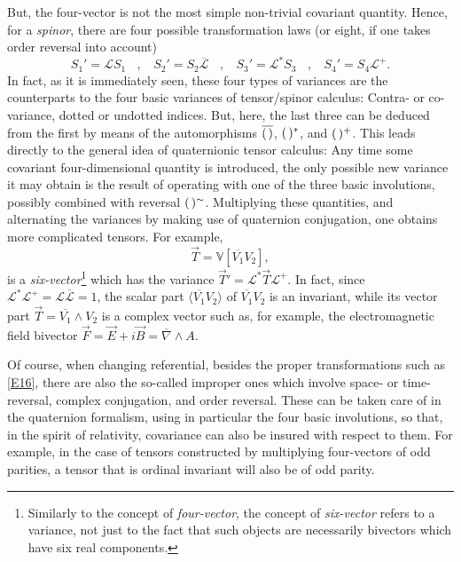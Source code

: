 \documentclass [12pt,a4paper      ]{article}
\newcommand{\CON}{\overline}          %
\newcommand{\Vect}{\mathbb{V}}        %
\newcommand{\vect}{\wedge}            %
\newcommand{\SCA}{\langle}            %
\newcommand{\LAR}{\rangle}            %
\newcommand{\A}{(\hspace{.5mm})} %
\newcommand{\REV}{\sim}               %
\begin{document}
     But,  the four-vector is  not  the  most  simple non-trivial 
covariant quantity.  Hence, for a \emph{spinor}, there are four possible 
transformation laws (or eight,  if one takes order reversal into account)
%
\begin{equation}\label{E21}
   S_1 ' = \mathcal{L} S_1  ~~~~, ~~~~
   S_2 ' = S_2 \CON{\mathcal{L}}  ~~~~, ~~~~
   S_3 ' = \mathcal{L}^*S_3  ~~~~, ~~~~
   S_4 ' = S_4 \mathcal{L}^+. %
\end{equation}
%
In  fact, as it is immediately seen, these four types of variances  
are the counterparts to the four basic variances of tensor/spinor 
calculus:  Contra- or  co-variance,  dotted or undotted  indices.  
But, here, the last three can be deduced from the first by means of 
the  automorphisms $\CON{\A}$, $\A^*$, and $\A^+$. This leads directly 
to the general idea of quaternionic tensor calculus:   Any time some 
covariant four-dimensional quantity is introduced, the only possible 
new variance it may obtain is the result of operating with one of 
the  three  basic involutions,  possibly  combined  with  reversal
 $\A^\REV$.   Multiplying these quantities, and alternating 
the  variances  by  making use  of  quaternion  conjugation,  one 
obtains more complicated tensors. For example,
%
\begin{equation}\label{E22}     
                \vec{T} = \Vect[\CON{V_1} V_2],             %
\end{equation}
%
is  a \emph{six-vector}\footnote{Similarly to the concept of \emph{four-vector}, the concept of \emph{six-vector} refers to a variance, not just to the fact that such objects are necessarily bivectors which have six real components.} which has the variance $\vec{T}' = \mathcal{L}^*{\vec{T}}\mathcal{L}^+$. In fact, since 
$\mathcal{L}^* \mathcal{L}^+  = \mathcal{L} \CON{\mathcal{L}} =1$, the scalar part $\SCA \CON{V_1} V_2 \LAR$ of  $\CON{V_1} V_2$ is an invariant, while its 
vector part $\vec{T} =\CON{V_1} \vect V_2$ is a complex vector such as, for example, the electromagnetic field 
bivector $\vec{F} = \vec{E} +i \vec{B} = \CON{\nabla} \vect A$.

     Of  course,  when changing referential,  besides the  proper 
transformations such  as  \eqref{E16},  there  are  also  the  so-called 
improper ones which involve space- or time-reversal, complex conjugation, 
and order reversal.  These can be taken care of in the quaternion 
formalism, using in particular the four basic involutions, so that, 
in the spirit of relativity,  covariance can also be insured with 
respect to them.  For example, in the case of tensors constructed 
by  multiplying  four-vectors of odd parities,  a tensor  that is 
ordinal invariant will also be of odd parity.
\end{document}
